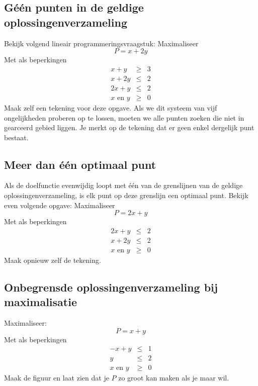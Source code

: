 \subsection{G\'{e}\'{e}n punten in de geldige oplossingenverzameling}
Bekijk volgend lineair programmeringsvraagstuk:
Maximaliseer
\begin{displaymath}
    P=x+2y
\end{displaymath}
Met als beperkingen
\begin{eqnarray*}
    x+y & \geqslant & 3  \\
    x+2y & \leqslant & 2  \\
    2x+y & \leqslant & 2  \\
    x \mbox{ en } y & \geqslant & 0
\end{eqnarray*}
Maak zelf een tekening voor deze opgave. Als we dit systeem van vijf ongelijkheden proberen op te lossen,
moeten we alle punten zoeken die niet in gearceerd gebied liggen. Je
merkt op de tekening dat er geen enkel dergelijk punt bestaat.



\subsection{Meer dan \'{e}\'{e}n optimaal punt}
Als de doelfunctie evenwijdig loopt met \'{e}\'{e}n van de grenslijnen
van de geldige oplossingenverzameling, is elk punt op deze grenslijn
een optimaal punt. Bekijk even volgende opgave:
Maximaliseer
\begin{displaymath}
    P=2x+y
\end{displaymath}
Met als beperkingen
\begin{eqnarray*}
    2x+y & \leqslant & 2  \\
    x+2y & \leqslant & 2  \\
    x \mbox{ en }y & \geqslant & 0
\end{eqnarray*}
Maak opnieuw zelf de tekening.



\subsection{Onbegrensde oplossingenverzameling bij maximalisatie}
Maximaliseer:
\begin{displaymath}
    P=x+y
\end{displaymath}
Met als beperkingen
\begin{eqnarray*}
    -x+y & \leqslant & 1  \\
    y & \leqslant & 2  \\
    x \mbox{ en } y & \geqslant & 0
\end{eqnarray*}
Maak de figuur en laat zien dat je $P$ zo groot kan maken als je maar wil.


